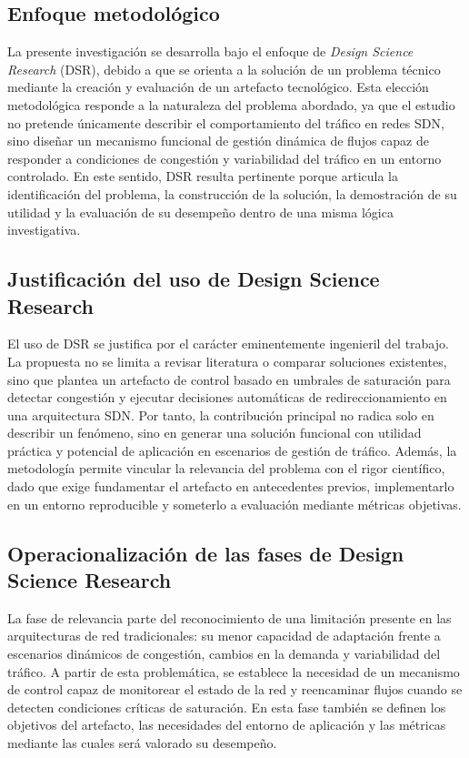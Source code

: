 \documentclass[12pt,a4paper]{article}
\begin{document}
\subsection{Enfoque metodológico}

La presente investigación se desarrolla bajo el enfoque de \textit{Design Science Research} (DSR), debido a que se orienta a la solución de un problema técnico mediante la creación y evaluación de un artefacto tecnológico. Esta elección metodológica responde a la naturaleza del problema abordado, ya que el estudio no pretende únicamente describir el comportamiento del tráfico en redes SDN, sino diseñar un mecanismo funcional de gestión dinámica de flujos capaz de responder a condiciones de congestión y variabilidad del tráfico en un entorno controlado. En este sentido, DSR resulta pertinente porque articula la identificación del problema, la construcción de la solución, la demostración de su utilidad y la evaluación de su desempeño dentro de una misma lógica investigativa.

\subsection{Justificación del uso de Design Science Research}

El uso de DSR se justifica por el carácter eminentemente ingenieril del trabajo. La propuesta no se limita a revisar literatura o comparar soluciones existentes, sino que plantea un artefacto de control basado en umbrales de saturación para detectar congestión y ejecutar decisiones automáticas de redireccionamiento en una arquitectura SDN. Por tanto, la contribución principal no radica solo en describir un fenómeno, sino en generar una solución funcional con utilidad práctica y potencial de aplicación en escenarios de gestión de tráfico. Además, la metodología permite vincular la relevancia del problema con el rigor científico, dado que exige fundamentar el artefacto en antecedentes previos, implementarlo en un entorno reproducible y someterlo a evaluación mediante métricas objetivas.

\subsection{Operacionalización de las fases de Design Science Research}

La fase de relevancia parte del reconocimiento de una limitación presente en las arquitecturas de red tradicionales: su menor capacidad de adaptación frente a escenarios dinámicos de congestión, cambios en la demanda y variabilidad del tráfico. A partir de esta problemática, se establece la necesidad de un mecanismo de control capaz de monitorear el estado de la red y reencaminar flujos cuando se detecten condiciones críticas de saturación. En esta fase también se definen los objetivos del artefacto, las necesidades del entorno de aplicación y las métricas mediante las cuales será valorado su desempeño.
\end{document}
